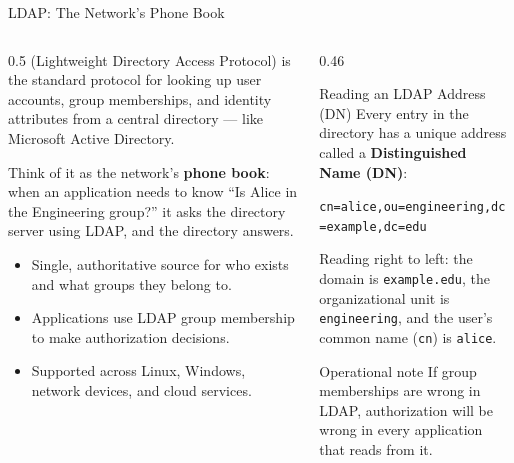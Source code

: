 \documentclass[aspectratio=169]{beamer}  %
\begin{document}
\begin{frame}{LDAP: The Network's Phone Book}
    \begin{columns}[T]
        \begin{column}{0.5\textwidth}
            \footnotesize
             (Lightweight Directory Access Protocol) is the standard protocol for looking up user accounts, group memberships, and identity attributes from a central directory --- like Microsoft Active Directory.

            \vspace{0.3em}
            Think of it as the network's \textbf{phone book}: when an application needs to know ``Is Alice in the Engineering group?'' it asks the directory server using LDAP, and the directory answers.

            \vspace{0.3em}
            \begin{itemize}
                \item Single, authoritative source for who exists and what groups they belong to.
                \item Applications use LDAP group membership to make authorization decisions.
                \item Supported across Linux, Windows, network devices, and cloud services.
            \end{itemize}
        \end{column}
        \begin{column}{0.46\textwidth}
            \begin{exampleblock}{Reading an LDAP Address (DN)}
                \footnotesize
                Every entry in the directory has a unique address called a \textbf{Distinguished Name (DN)}:

                \vspace{0.3em}
                \texttt{cn=alice,ou=engineering,dc=example,dc=edu}

                \vspace{0.3em}
                Reading right to left: the domain is \texttt{example.edu}, the organizational unit is \texttt{engineering}, and the user's common name (\texttt{cn}) is \texttt{alice}.
            \end{exampleblock}
            \begin{alertblock}{Operational note}
                \footnotesize
                If group memberships are wrong in LDAP, authorization will be wrong in every application that reads from it.
            \end{alertblock}
        \end{column}
    \end{columns}
\end{frame}
\end{document}
